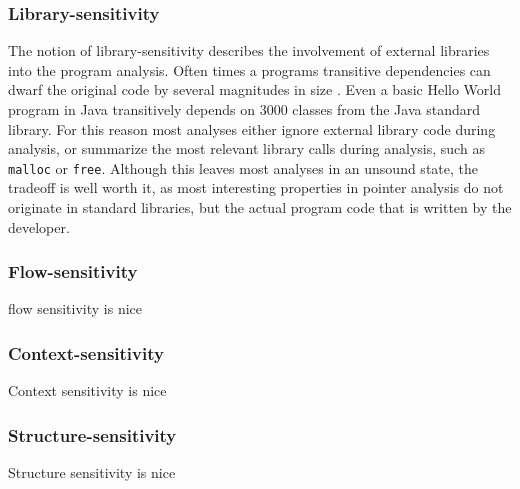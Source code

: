\subsubsection{Library-sensitivity}
The notion of library-sensitivity describes the involvement of external libraries into the program analysis.
Often times a programs transitive dependencies can dwarf the original code by several magnitudes in size \cite{toman2017taming}.
Even a basic Hello World program in Java transitively depends on 3000 classes \cite{kulkarni2016accelerating} from the Java standard library.
For this reason most analyses either ignore external library code during analysis, or summarize the most relevant library calls during analysis, such as \verb|malloc| or \verb|free|.
Although this leaves most analyses in an unsound state, the tradeoff is well worth it, as most interesting properties in pointer analysis do not originate in standard libraries, but the actual program code that is written by the developer.

\subsubsection{Flow-sensitivity}
flow sensitivity is nice
\subsubsection{Context-sensitivity}
Context sensitivity is nice

\subsubsection{Structure-sensitivity}
Structure sensitivity is nice


